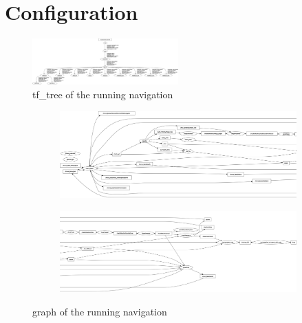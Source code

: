 \chapter{Configuration}
\label{config}

\begin{figure}[H]
	\includegraphics[angle=90, width=0.5\textwidth]{Pictures/tf tree}
	\caption{tf\_tree of the running navigation}
 	\label{tftree concept}
\end{figure}


\begin{figure}[H]
	\centering
	\begin{subfigure}{.45\textwidth}
		\includegraphics[angle=90, width=\linewidth]{Pictures/rosgraphleft}
	\end{subfigure}
	\begin{subfigure}{.45\textwidth}
		\includegraphics[angle=90, width=\linewidth]{Pictures/rosgraphright}
	\end{subfigure}
	\caption{graph of the running navigation}
	
 	\label{graph concept}
\end{figure}